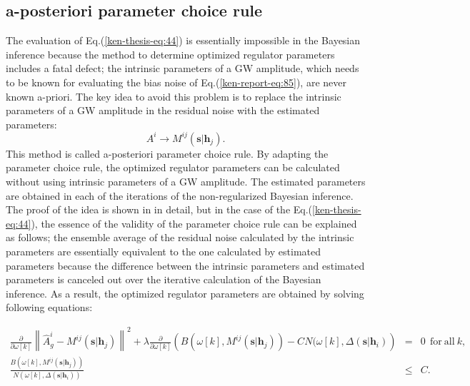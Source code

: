 \documentclass[%
 aps,
 prd,
 amsmath,amssymb,
 reprint,%
superscriptaddress
]{revtex4-1}
\begin{document}
\subsection{a-posteriori parameter choice rule}\label{ken-thesis-sec:impr-post-param}
The evaluation of Eq.(\ref{ken-thesis-eq:44}) is essentially impossible in the Bayesian inference because the method to determine optimized regulator parameters includes a fatal defect; the intrinsic parameters of a GW amplitude, which needs to be known for evaluating the bias noise of Eq.(\ref{ken-report-eq:85}), are never known a-priori. The key idea to avoid this problem is to replace the intrinsic parameters of a GW amplitude  in the residual noise with the estimated parameters:
\begin{equation}\label{ken-thesis-eq:55}
  A^{i}\rightarrow M^{ij}\left(\bm{s}|\bm{h}_{j}\right).
\end{equation}
This method is called a-posteriori parameter choice rule\cite{engl1996regularization}. By adapting the parameter choice rule, the optimized regulator parameters can be calculated without using intrinsic parameters of a GW amplitude. The estimated parameters are obtained in each of the iterations of the non-regularized Bayesian inference. The proof of the idea is shown in \cite{engl1996regularization}\cite{ENGL1988395} in detail, but in the case of the Eq.(\ref{ken-thesis-eq:44}), the essence of the validity of the parameter choice rule can be explained as follows; the ensemble average of the residual noise calculated by the intrinsic parameters are essentially equivalent to the one calculated by estimated parameters because the difference between the intrinsic parameters and estimated parameters is canceled out over the iterative calculation of the Bayesian inference. As a result, the optimized regulator parameters are obtained by solving following equations:
\begin{widetext}
 \begin{eqnarray}\label{ken-thesis-eq:52}
 \frac{\partial}{\partial \omega[k]}\left\|\hat{A}_{g}^{i} - M^{ij}\left(\bm{s}|\bm{h}_{j}\right)\right\|^{2} + \lambda \frac{\partial}{\partial \omega[k]}\left(B(\omega[k], M^{ij}\left(\bm{s}|\bm{h}_{j}\right)) - CN(\omega[k], \Delta(\bm{s}|\bm{h}_{i})\right)&=&0\ \ \mathrm{for}\ \mathrm{all}\ k,\\
  \frac{B(\omega[k], M^{ij}\left(\bm{s}|\bm{h}_{j}\right))}{N(\omega[k], \Delta(\bm{s}|\bm{h}_{i}))} &\leq& C.\nonumber
\end{eqnarray}
\end{widetext}
\end{document}
